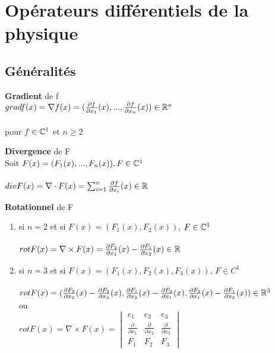 \chapter[Opérateurs différentiels de la physique]{Opérateurs différentiels de la physique}

\section{Généralités}

\begin{myDefinition} {\bf Gradient} de f\\
	$grad f(x)=\nabla f(x)=(\frac{\partial f}{\partial x_1}(x), ...,\frac{\partial f}{\partial x_n}(x))\in\mathbb{R}^n$
	\\\\
	pour $f\in \mathbb{C}^1$ et $n\geq2$
\end{myDefinition}

\begin{myDefinition} {\bf Divergence} de F\\
	Soit $F(x)=(F_1(x),...,F_n(x)), F \in \mathbb{C}^1$
	\\\\
	$div F(x)=\nabla \cdot F(x)=\sum_{i=1}^{n}\frac{\partial f}{\partial x_i}(x) \in \mathbb{R}$
\end{myDefinition}

\begin{myDefinition} {\bf Rotationnel} de F
	\begin{enumerate}
		\item si $n=2$ et si $F(x)=(F_1(x),F_2(x))$, $F\in \mathbb{C}^1$
		\\\\
		$rot F(x)=\nabla \times F(x)=\frac{\partial F_2}{\partial x_1}(x)-\frac{\partial F_1}{\partial x_2}(x) \in \mathbb{R}$
		\item si $n=3$ et si $F(x)=(F_1(x), F_2(x), F_3(x))$, $F\in C^1$
		\\\\
		$rot F(x)=(\frac{\partial F_3}{\partial x_2}(x)-\frac{\partial F_2}{\partial x_3}(x),\frac{\partial F_1}{\partial x_2}(x)-\frac{\partial F_3}{\partial x_1}(x),\frac{\partial F_2}{\partial x_1}(x)-\frac{\partial F_1}{\partial x_2}(x)) \in \mathbb{R}^3$
		\\
		ou
		\\
		$rot F(x)=\nabla \times F(x)=
		\begin{vmatrix}
		e_1&e_2&e_3
		\\
		\frac{\partial}{\partial x_1}&\frac{\partial}{\partial x_2}&\frac{\partial}{\partial x_3}
		\\
		F_1&F_2&F_3
		\end{vmatrix}$
	\end{enumerate}
\end{myDefinition}

